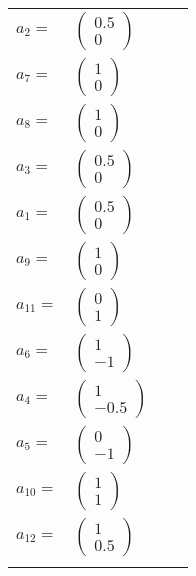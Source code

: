 \documentclass[1p]{elsarticle_modified}
\theoremstyle{definition}
\begin{document}
\begin{tabular}{m{7pt} m{180pt} m{7pt} m{180pt} }
\flushright $a_{2}=$&$\begin{pmatrix}0.5\\0\end{pmatrix}$ \\
\flushright $a_{7}=$&$\begin{pmatrix}1\\0\end{pmatrix}$ \\
\flushright $a_{8}=$&$\begin{pmatrix}1\\0\end{pmatrix}$ \\
\flushright $a_{3}=$&$\begin{pmatrix}0.5\\0\end{pmatrix}$ \\
\flushright $a_{1}=$&$\begin{pmatrix}0.5\\0\end{pmatrix}$ \\
\flushright $a_{9}=$&$\begin{pmatrix}1\\0\end{pmatrix}$ \\
\flushright $a_{11}=$&$\begin{pmatrix}0\\1\end{pmatrix}$ \\
\flushright $a_{6}=$&$\begin{pmatrix}1\\-1\end{pmatrix}$ \\
\flushright $a_{4}=$&$\begin{pmatrix}1\\-0.5\end{pmatrix}$ \\
\flushright $a_{5}=$&$\begin{pmatrix}0\\-1\end{pmatrix}$ \\
\flushright $a_{10}=$&$\begin{pmatrix}1\\1\end{pmatrix}$ \\
\flushright $a_{12}=$&$\begin{pmatrix}1\\0.5\end{pmatrix}$\\&\end{tabular}
\end{document}
